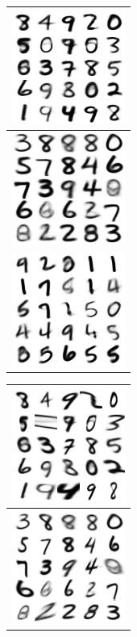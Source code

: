 \documentclass[letterpaper, twoside]{article}
\begin{document}
\begin{figure}[h]
\centering
\begin{minipage}{.5\textwidth}
\centering
\begin{tabular}{|@{}c@{}|}
\includegraphics[scale=1]{manifold_ident_50.jpg}\\ \hline
\includegraphics[scale=1]{manifold_ident_51.jpg}\\ \hline
\includegraphics[scale=1]{manifold_ident_52.jpg}\\
\end{tabular}
\end{minipage}%
\begin{minipage}{.5\textwidth}
\centering
\begin{tabular}{|@{}c@{}|}
\includegraphics[scale=1]{manifold_sig_50.jpg}\\ \hline
\includegraphics[scale=1]{manifold_sig_51.jpg}\\ \hline

\end{tabular}
\end{minipage}
\end{figure}
\end{document}
